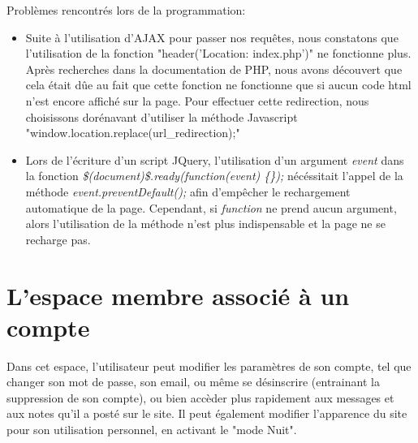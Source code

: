             \bigskip
            Problèmes rencontrés lors de la programmation:
            \begin{itemize}
                \item Suite à l'utilisation d'AJAX pour passer nos requêtes, nous constatons que l'utilisation de la fonction "header('Location: index.php')" ne fonctionne plus. Après recherches dans la documentation de PHP, nous avons découvert que cela était dûe au fait que cette fonction ne fonctionne que si aucun code html n'est encore affiché sur la page. Pour effectuer cette redirection, nous choisissons dorénavant d'utiliser la méthode Javascript "window.location.replace(url\_redirection);"

                \item Lors de l'écriture d'un script JQuery, l'utilisation d'un argument {\itshape event} dans la fonction {\itshape \$(document)\$.ready(function(event) \{\});} nécéssitait l'appel de la méthode {\itshape event.preventDefault();} afin d'empêcher le rechargement automatique de la page. Cependant, si {\itshape function} ne prend aucun argument, alors l'utilisation de la méthode n'est plus indispensable et la page ne se recharge pas. 
            \end{itemize}


    \section{L'espace membre associé à un compte}



        Dans cet espace, l'utilisateur peut modifier les paramètres de son compte, tel que changer son mot de passe, son email, ou même se désinscrire (entrainant la suppression de son compte), ou bien accèder plus rapidement aux messages et aux notes qu'il a posté sur le site. Il peut également modifier l'apparence du site pour son utilisation personnel, en activant le "mode Nuit".

